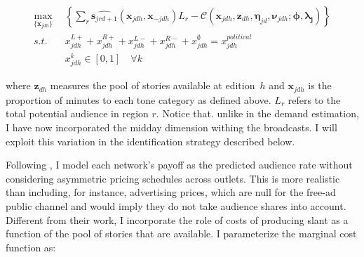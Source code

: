 \documentclass[12pt]{article}
\begin{document}
\begin{equation}\label{eq:payoffs}
	\begin{aligned}
		\max_{\{\mathbf{x}_{jdh}\}}   & \left\{   \sum_{r}\widehat{\bm{s}_{jrd+1}}(\bm{x}_{jdh}, \bm{x}_{-jdh})L_r -  \mathcal{C}\left(  \bm{x}_{jdh},\bm{z}_{dh}, \bm{\eta}_{jd},\bm{\nu}_{jdh}; \bm{\phi},\bm{\lambda_j}   \right)    \right\}\\
		s.t.   \quad &   x_{jdh}^{L+} +x_{jdh}^{R+} + x_{jdh}^{L-} + x_{jdh}^{R-} + x_{jdh}^{\emptyset} = x_{jdh}^{political}\\
		& x_{jdh}^k \in [0,1] \quad \forall k
	\end{aligned}
\end{equation} 



where $\bm z_{dh}$ measures the pool of stories available at edition~$h$ and $\bm x_{jdh}$ is the proportion of minutes to each tone category as defined above. $L_r$  refers to the total potential audience in region $r$. Notice that. unlike in the demand estimation, I have now incorporated the midday dimension withing the broadcasts. I will exploit this variation in the identification strategy described below. 

Following \cite{Goettler2001SpatialCI}, I model each network's payoff as the predicted audience rate without considering asymmetric pricing schedules across outlets. This is more realistic than including, for instance, advertising prices, which are null for the free-ad public channel and would imply they do not take audience shares into account. Different from their work, I incorporate the role of costs of producing slant as a function of the pool of stories that are available. I parameterize the marginal cost function as:

\end{document}

